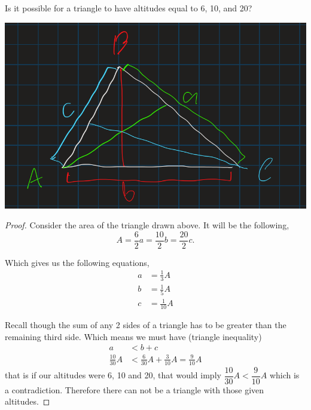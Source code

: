 \documentclass[11pt]{article}
\newenvironment{problem}[2][Problem\!]{\begin{trivlist}
\item[\hskip \labelsep {\bfseries #1}\hskip \labelsep {\bfseries #2}]}{\end{trivlist}}
\begin{document}
\newpage
\begin{tcolorbox}
    \begin{problem} {IC | 11/15 | 151.}
        Is it possible for a triangle to have altitudes equal to 6, 10, and 20?
    \end{problem}
\end{tcolorbox}
\includegraphics[scale=.5]{prob2}
\begin{proof}
    Consider the area of the triangle drawn above. It will be the following,
    \[A = \frac{6}{2}a = \frac{10}{2}b = \frac{20}{2}c.\]

    Which gives us the following equations,
    \begin{align*}
        a &= \frac{1}{3}A \\
        b &= \frac{1}{5}A \\
        c &= \frac{1}{10}A
    \end{align*}

    Recall though the sum of any 2 sides of a triangle has to be greater than the remaining third side. Which means we must have (triangle inequality)
    \begin{align*}
        a &< b + c \\
        \frac{10}{30}A &< \frac{6}{30}A + \frac{3}{10}A = \frac{9}{10}A
    \end{align*}
    that is if our altitudes were 6, 10 and 20, that would imply $\dfrac{10}{30}A < \dfrac{9}{10}A$ which is a contradiction. Therefore there can not be a triangle with those given altitudes. 
\end{proof}
\end{document}
